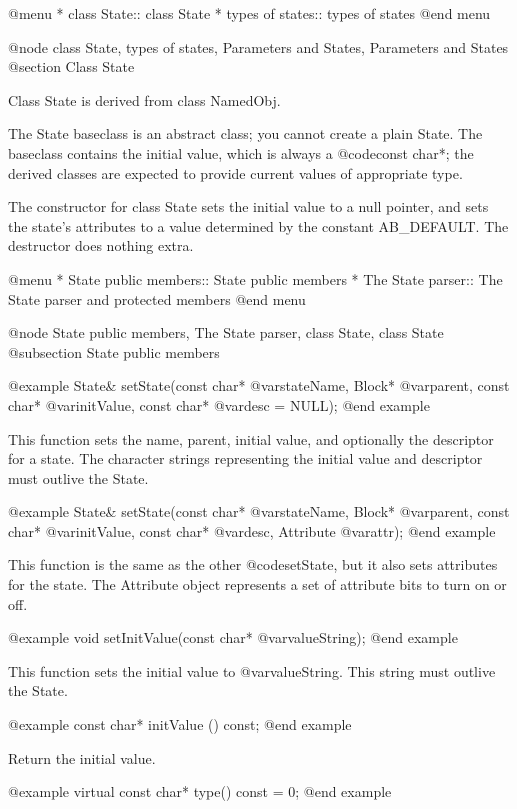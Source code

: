@menu
* class State::                 class State
* types of states::             types of states
@end menu

@node class State, types of states, Parameters and States, Parameters and States
@section Class State

Class State is derived from class NamedObj.

The State baseclass is an abstract class; you cannot create a plain
State.  The baseclass contains the initial value, which is always
a @code{const char*}; the derived classes are expected to provide
current values of appropriate type.

The constructor for class State sets the initial value to a null
pointer, and sets the state's attributes to a value determined by
the constant AB_DEFAULT.  The destructor does nothing extra.

@menu
* State public members::        State public members
* The State parser::            The State parser and protected members
@end menu

@node State public members, The State parser, class State, class State
@subsection State public members

@example
State& setState(const char* @var{stateName}, Block* @var{parent},
               const char* @var{initValue}, const char* @var{desc} = NULL);
@end example

This function sets the name, parent, initial value, and optionally the
descriptor for a state.  The character strings representing the initial
value and descriptor must outlive the State.

@example
State& setState(const char* @var{stateName}, Block* @var{parent},
               const char* @var{initValue}, const char* @var{desc},
               Attribute @var{attr});
@end example

This function is the same as the other @code{setState}, but it also
sets attributes for the state.  The Attribute object represents a
set of attribute bits to turn on or off.

@example
void setInitValue(const char* @var{valueString});
@end example

This function sets the initial value to @var{valueString}.  This
string must outlive the State.

@example
const char* initValue () const;
@end example

Return the initial value.

@example
virtual const char* type() const = 0;
@end example

